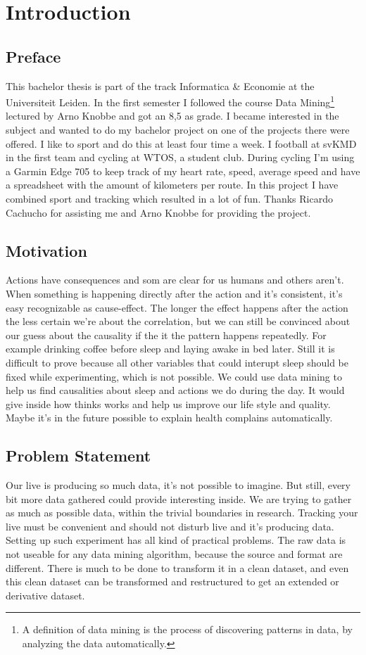 \section{Introduction}
	\subsection{Preface}
		This bachelor thesis is part of the track Informatica \& Economie at the Universiteit Leiden. In the first semester I followed the course Data Mining\footnote{A definition of data mining is the process of discovering patterns in data, by analyzing the data automatically\cite{datamining}.} lectured by Arno Knobbe and got an 8,5 as grade. I became interested in the subject and wanted to do my bachelor project on one of the projects there were offered. I like to sport and do this at least four time a week. I football at svKMD in the first team and cycling at WTOS, a student club. During cycling I'm using a Garmin Edge 705 to keep track of my heart rate, speed, average speed and have a spreadsheet with the amount of kilometers per route. In this project I have combined sport and tracking which resulted in a lot of fun. Thanks Ricardo Cachucho for assisting me and Arno Knobbe for providing the project.

	\subsection{Motivation}
		Actions have consequences and som are clear for us humans and others aren't. When something is happening directly after the action and it's consistent, it's easy recognizable as cause-effect. The longer the effect happens after the action the less certain we're about the correlation, but we can still be convinced about our guess about the causality if the it the pattern happens repeatedly. For example drinking coffee before sleep and laying awake in bed later. Still it is difficult to prove because all other variables that could interupt sleep should be fixed while experimenting, which is not possible. We could use data mining to help us find causalities about sleep and actions we do during the day. It would give inside how thinks works and help us improve our life style and quality. Maybe it's in the future possible to explain health complains automatically.

	\subsection{Problem Statement}
		Our live is producing so much data, it's not possible to imagine. But still, every bit more data gathered could provide interesting inside. We are trying to gather as much as possible data, within the trivial boundaries in research. Tracking your live must be convenient and should not disturb live and it's producing data. Setting up such experiment has all kind of practical problems. The raw data is not useable for any data mining algorithm, because the source and format are different. There is much to be done to transform it in a clean dataset, and even this clean dataset can be transformed and restructured to get an extended or derivative dataset. 

